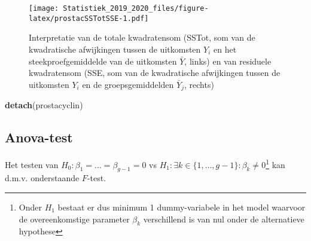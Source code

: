 \documentclass[12pt,dutch,coursenotes]{book}
\newenvironment{Shaded}{\begin{snugshade}}{\end{snugshade}}
\newcommand{\KeywordTok}[1]{\textcolor[rgb]{0.13,0.29,0.53}{\textbf{#1}}}
\newcommand{\DataTypeTok}[1]{\textcolor[rgb]{0.13,0.29,0.53}{#1}}
\newcommand{\DecValTok}[1]{\textcolor[rgb]{0.00,0.00,0.81}{#1}}
\newcommand{\StringTok}[1]{\textcolor[rgb]{0.31,0.60,0.02}{#1}}
\newcommand{\ControlFlowTok}[1]{\textcolor[rgb]{0.13,0.29,0.53}{\textbf{#1}}}
\newcommand{\OperatorTok}[1]{\textcolor[rgb]{0.81,0.36,0.00}{\textbf{#1}}}
\newcommand{\NormalTok}[1]{#1}
\let\rmarkdownfootnote\footnote%
\def\footnote{\protect\rmarkdownfootnote}
\theoremstyle{definition}
\theoremstyle{definition}
\theoremstyle{definition}
\theoremstyle{remark}
\begin{document}
\begin{Shaded}
\end{Shaded}

\begin{figure}
\centering
\texttt{[image: Statistiek\_2019\_2020\_files/figure-latex/prostacSSTotSSE-1.pdf]}
\caption{\label{fig:prostacSSTotSSE}Interpretatie van de totale kwadratensom
(SSTot, som van de kwadratische afwijkingen tussen de uitkomsten
\(Y_{i}\) en het steekproefgemiddelde van de uitkomsten \(\bar Y\),
links) en van residuele kwadratensom (SSE, som van de kwadratische
afwijkingen tussen de uitkomsten \(Y_{i}\) en de groepsgemiddelden
\(\bar Y_j\), rechts)}
\end{figure}

\begin{Shaded}
\begin{Highlighting}[]
\KeywordTok{detach}\NormalTok{(prostacyclin)}
\end{Highlighting}
\end{Shaded}

\subsection{Anova-test}\label{anova-test}

Het testen van \(H_0: \beta_1=\ldots=\beta_{g-1}=0\) vs
\(H_1: \exists k \in\{1,\ldots,g-1\} : \beta_k \neq0\)\footnote{Onder
  \(H_1\) bestaat er dus minimum 1 dummy-variabele in het model waarvoor
  de overeenkomstige parameter \(\beta_k\) verschillend is van nul onder
  de alternatieve hypothese} kan d.m.v. onderstaande \(F\)-test.
\end{document}
